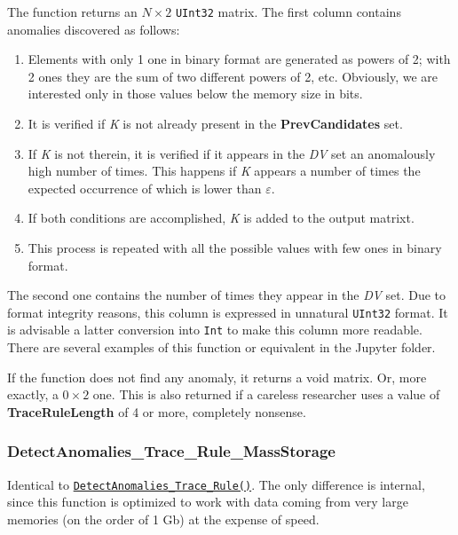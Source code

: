 \begin{itemize}
	 The function returns an \(N\times 2\) \texttt{UInt32} matrix. The first column contains anomalies discovered as follows:
	 
	 \begin{enumerate}
	 	\item Elements with only 1 one in binary format are generated as powers of 2; with 2 ones they are the sum of two different powers of 2, etc. Obviously, we are interested only in those values below the memory size in bits.
	 	\item It is verified if \textit{K} is not already present in the \textbf{PrevCandidates} set.
	 	\item If \textit{K} is not therein, it is verified if it appears in the \textit{DV} set an anomalously high number of times. This happens if \textit{K} appears a number of times the expected occurrence of which is lower than \textbf{\(\varepsilon\)}.
	 	\item If both conditions are accomplished, \textit{K} is added to the output matrixt.
	 	\item This process is repeated with all the possible values with few ones in binary format.
	 \end{enumerate}
	 
	 The second one contains the number of times they appear in the \textit{DV} set. Due to format integrity reasons, this column is expressed in unnatural \texttt{UInt32} format. 	 
	 It is advisable a latter conversion into \texttt{Int} to make this column more readable. There are several examples of this function or equivalent in the Jupyter folder.
	 
	 If the function does not find any anomaly, it returns a void matrix.  Or, more exactly, a \(0\times 2\) one. This is also returned if a careless researcher uses a value of \textbf{TraceRuleLength} of 4 or more, completely nonsense.
	 
\end{itemize}
%
\subsubsection*{DetectAnomalies\_Trace\_Rule\_MassStorage}\label{Fun:DetectAnomaliesTraceRule_MassStorage}
%
Identical to \hyperref[Fun:DetectAnomaliesTraceRule]{\texttt{DetectAnomalies\_Trace\_Rule()}}. The only difference is internal, since this function is optimized to work with data coming from very large memories (on the order of 1 Gb) at the expense of speed. 
%
%
